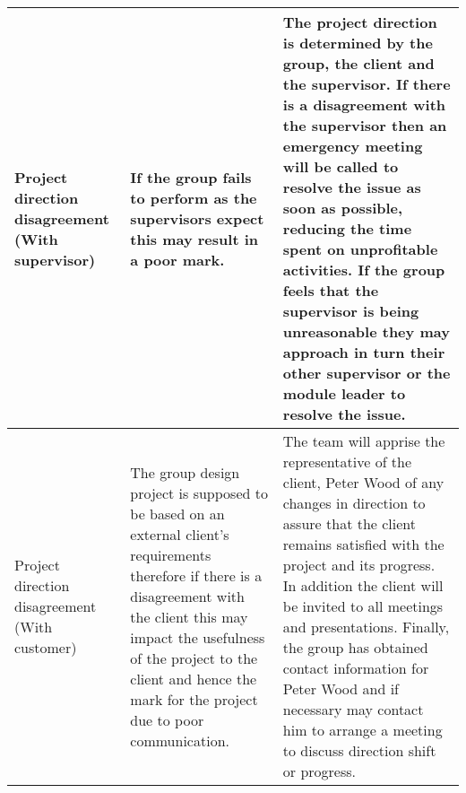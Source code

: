\begin{center}
\begin{landscape}
\begin{longtable}{|p{3cm}|p{7cm}|p{12cm}|}
        Project direction disagreement (With supervisor) & If the group fails to perform as the supervisors expect this may result in a poor mark.                                                                                                                                                                                                                                                                                      & The project direction is determined by the group, the client and the supervisor. If there is a disagreement with the supervisor then an emergency meeting will be called to resolve the issue as soon as possible, reducing the time spent on unprofitable activities. If the group feels that the supervisor is being unreasonable they may approach in turn their other supervisor or the module leader to resolve the issue.                                                                                                                                                                                                                                                                                                                                                                                                                                                                                                                                                                                                          \\ \hline
        Project direction disagreement (With customer)   & The group design project is supposed to be based on an external client's requirements therefore if there is a disagreement with the client this may impact the usefulness of the project to the client and hence the mark for the project due to poor communication.                                                                                                         & The team will apprise the representative of the client, Peter Wood of any changes in direction to assure that the client remains satisfied with the project and its progress. In addition the client will be invited to all meetings and presentations. Finally, the group has obtained contact information for Peter Wood and if necessary may contact him to arrange a meeting to discuss direction shift or progress.                                                                                                                                                                                                                                                                                                                                                                                                                                                                                                                                                                                                                 \\ \hline

\end{longtable}
\end{landscape}
\end{center}
